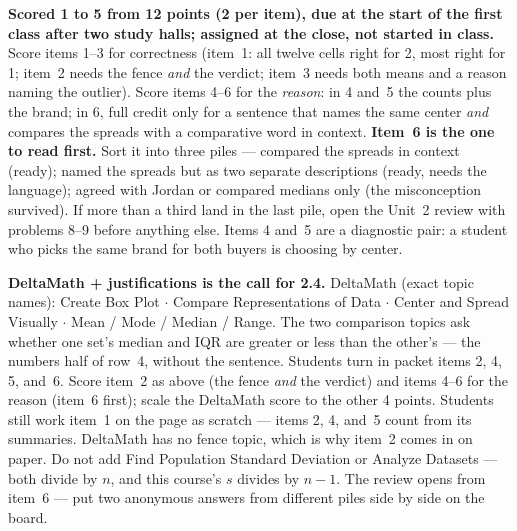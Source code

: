 \documentclass[10pt]{article}
\begin{document}
\begin{teachernote}[Homework]
\textbf{Scored 1 to 5 from 12 points (2 per item), due at the start of the first class after two study
halls; assigned at the close, not started in class.} Score items 1--3 for correctness (item~1:
all twelve cells right for 2, most right for 1; item~2 needs the fence \emph{and} the verdict;
item~3 needs both means and a reason naming the outlier). Score items 4--6 for the
\emph{reason}: in 4 and~5 the counts plus the brand; in 6, full credit only for a sentence that
names the same center \emph{and} compares the spreads with a comparative word in context.
\textbf{Item~6 is the one to read first.} Sort it into three piles --- compared the spreads in
context (ready); named the spreads but as two separate descriptions (ready, needs the
language); agreed with Jordan or compared medians only (the misconception survived). If more
than a third land in the last pile, open the Unit~2 review with problems 8--9 before
anything else. Items 4 and~5 are a diagnostic pair: a student who picks the same brand for
both buyers is choosing by center.

\textbf{DeltaMath + justifications is the call for 2.4.} DeltaMath (exact topic names): Create
Box Plot $\cdot$ Compare Representations of Data $\cdot$ Center and Spread Visually $\cdot$ Mean
/ Mode / Median / Range. The two comparison topics ask whether one set's median and IQR are
greater or less than the other's --- the numbers half of row~4, without the sentence. Students
turn in packet items 2, 4, 5, and~6. Score item~2 as above (the fence \emph{and} the verdict)
and items 4--6 for the reason (item~6 first); scale the DeltaMath score to the other 4 points.
Students still work item~1 on the page as scratch --- items 2, 4, and~5 count from its
summaries. DeltaMath has no fence topic, which is why item~2 comes in on paper. Do not add Find Population Standard Deviation or Analyze Datasets --- both divide by $n$, and this course's $s$ divides by $n - 1$. The review opens from item~6 --- put two anonymous answers from
different piles side by side on the board.
\end{teachernote}
\end{document}
